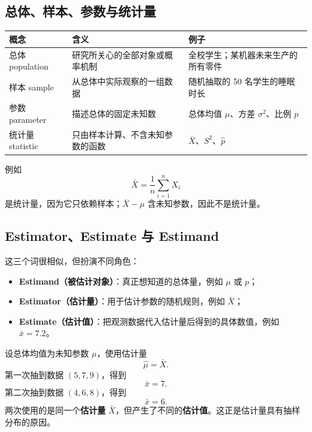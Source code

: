 \documentclass[11pt,a4paper]{article}
\begin{document}
\subsection{总体、样本、参数与统计量}

\begin{center}
\renewcommand{\arraystretch}{1.25}
\begin{tabularx}{\textwidth}{p{3.1cm}p{3.5cm}X}
\toprule
概念 & 含义 & 例子\\
\midrule
总体 population & 研究所关心的全部对象或概率机制
& 全校学生；某机器未来生产的所有零件\\
样本 sample & 从总体中实际观察的一组数据
& 随机抽取的 50 名学生的睡眠时长\\
参数 parameter & 描述总体的固定未知数
& 总体均值 $\mu$、方差 $\sigma^2$、比例 $p$\\
统计量 statistic & 只由样本计算、不含未知参数的函数
& $\bar X$、$S^2$、$\hat p$\\
\bottomrule
\end{tabularx}
\end{center}

\begin{warnbox}[统计量不能含未知参数]
例如
\[
  \bar X=\frac1n\sum_{i=1}^nX_i
\]
是统计量，因为它只依赖样本；$\bar X-\mu$ 含未知参数，因此不是统计量。
\end{warnbox}

\subsection{Estimator、Estimate 与 Estimand}

这三个词很相似，但扮演不同角色：

\begin{itemize}
  \item \textbf{Estimand（被估计对象）}：真正想知道的总体量，例如 $\mu$ 或 $p$；
  \item \textbf{Estimator（估计量）}：用于估计参数的随机规则，例如 $\bar X$；
  \item \textbf{Estimate（估计值）}：把观测数据代入估计量后得到的具体数值，例如 $\bar x=7.2$。
\end{itemize}

\begin{examplebox}
设总体均值为未知参数 $\mu$，使用估计量
\[
  \hat\mu=\bar X.
\]
第一次抽到数据 $(5,7,9)$，得到
\[
  \bar x=7.
\]
第二次抽到数据 $(4,6,8)$，得到
\[
  \bar x=6.
\]
两次使用的是同一个\textbf{估计量} $\bar X$，但产生了不同的\textbf{估计值}。这正是估计量具有抽样分布的原因。
\end{examplebox}
\end{document}
